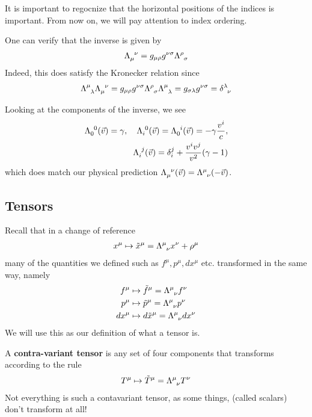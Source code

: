 It is important to regocnize that the horizontal positions of the indices is important.
From now on, we will pay attention to index ordering.

One can verify that the inverse is given by
\begin{align*}
  \tensor{\Lambda}{_{\mu}^{\nu}}
  = 
  g_{\mu \rho}g^{\nu \sigma} \tensor{\Lambda}{^{\rho}_{\sigma}}
\end{align*}
Indeed, this does satisfy the Kronecker relation since
\begin{align*}
  \tensor{\Lambda}{^{\mu}_{\lambda}}
  \tensor{\Lambda}{_{\mu}^{\nu}}
  = 
  g_{\mu \rho}g^{\nu \sigma} 
  \tensor{\Lambda}{^{\rho}_{\sigma}}
  \tensor{\Lambda}{^{\mu}_{\lambda}}
  = 
  g_{\sigma \lambda} g^{\nu \sigma} = 
  \tensor{\delta}{^{\lambda}_{\nu}}
\end{align*}

Looking at the components of the inverse, we see
\begin{align*}
  \tensor{\Lambda}{_0^0}
  (\vec{v}) = \gamma, 
  \quad
  \tensor{\Lambda}{_i^0}(\vec{v}) = \tensor{\Lambda}{_0^{i}}(\vec{v}) = - \gamma \frac{v^{i}}{c},\\
  \tensor{\Lambda}{_i^{j}}(\vec{v}) = \delta_i^{j} + \frac{v^{i}v^{j}}{v^{2}}(\gamma - 1)
\end{align*}
which does match our physical prediction $\tensor{\Lambda}{_{\mu}^{\nu}}(\vec{v}) = \tensor{\Lambda}{^\mu_\nu}(-\vec{v})$.


\subsection{Tensors}

Recall that in a change of reference
\begin{align*}
  x^{\mu} \mapsto \tilde{x}^{\mu} = \tensor{\Lambda}{^{\mu}_{\nu}} x^{\nu} + \rho^{\mu}
\end{align*}
many of the quantities we defined such as $f^{\mu},p^{\mu},dx^{\mu}$ etc. transformed in the same way, namely
\begin{align*}
  f^{\mu} &\mapsto  \tilde{f}^{\mu} = \tensor{\Lambda}{^{\mu}_{\nu}} f^{\nu}\\
  p^{\mu} &\mapsto  \tilde{p}^{\mu} = \tensor{\Lambda}{^{\mu}_{\nu}} p^{\nu}\\
  dx^{\mu} &\mapsto d \tilde{x}^{\mu} = \tensor{\Lambda}{^{\mu}_{\nu}} dx^{\nu}
\end{align*}
We will use this as our definition of what a tensor is.

A \textbf{contra-variant tensor} is any set of four components that transforms according to the rule
\begin{align*}
  T^{\mu} \mapsto  \tilde{T}^{\mu} = \tensor{\Lambda}{^{\mu}_{\nu}} T^{\nu}
\end{align*}
Not everything is such a contavariant tensor, as some things, (called scalars) don't transform at all!


